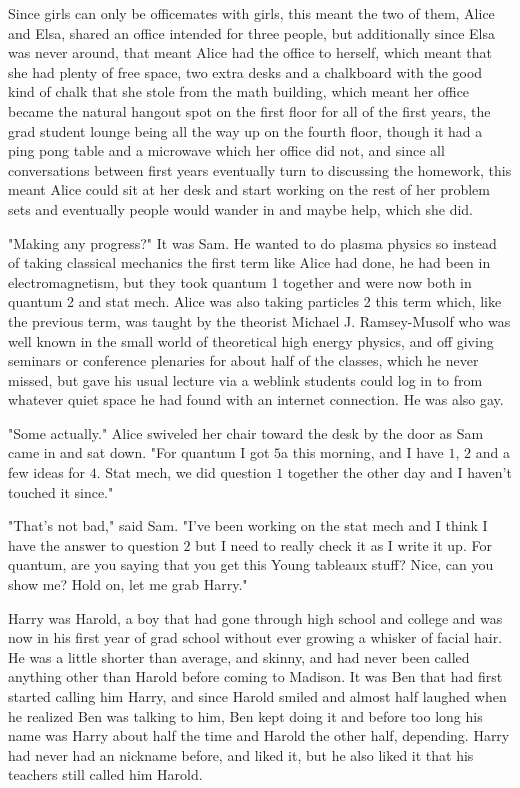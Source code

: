 \mypause

Since girls can only be officemates with girls, this meant the two of them, Alice and Elsa, shared an office intended for three people, but additionally since Elsa was never around, that meant Alice had the office to herself, which meant that she had plenty of free space, two extra desks and a chalkboard with the good kind of chalk that she stole from the math building, which meant her office became the natural hangout spot on the first floor for all of the first years, the grad student lounge being all the way up on the fourth floor, though it had a ping pong table and a microwave which her office did not, and since all conversations between first years eventually turn to discussing the homework, this meant Alice could sit at her desk and start working on the rest of her problem sets and eventually people would wander in and maybe help, which she did.

\mypause

"Making any progress?" It was Sam. He wanted to do plasma physics so instead of taking classical mechanics the first term like Alice had done, he had been in electromagnetism, but they took quantum 1 together and were now both in quantum 2 and stat mech. Alice was also taking particles 2 this term which, like the previous term, was taught by the theorist Michael J. Ramsey-Musolf who was well known in the small world of theoretical high energy physics, and off giving seminars or conference plenaries for about half of the classes, which he never missed, but gave his usual lecture via a weblink students could log in to from whatever quiet space he had found with an internet connection. He was also gay. 

"Some actually." Alice swiveled her chair toward the desk by the door as Sam came in and sat down. "For quantum I got $5$a this morning, and I have $1$, $2$ and a few ideas for $4$. Stat mech, we did question $1$ together the other day and I haven't touched it since." 

"That's not bad," said Sam. "I've been working on the stat mech and I think I have the answer to question $2$ but I need to really check it as I write it up. For quantum, are you saying that you get this Young tableaux stuff? Nice, can you show me? Hold on, let me grab Harry." 

Harry was Harold, a boy that had gone through high school and college and was now in his first year of grad school without ever growing a whisker of facial hair. He was a little shorter than average, and skinny, and had never been called anything other than Harold before coming to Madison. It was Ben that had first started calling him Harry, and since Harold smiled and almost half laughed when he realized Ben was talking to him, Ben kept doing it and before too long his name was Harry about half the time and Harold the other half, depending. Harry had never had an nickname before, and liked it, but he also liked it that his teachers still called him Harold. 

